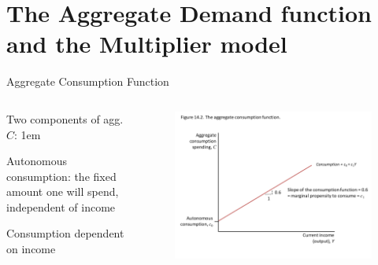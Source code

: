 \documentclass[11pt,aspectratio=43,usenames,dvipsnames]{beamer}
\let\oldenumerate=\enumerate
\let\endoldenumerate=\endenumerate
\renewenvironment{enumerate}{\oldenumerate \itemsep1em}{ \endoldenumerate}
\theoremstyle{definition}
\begin{document}
\section[AD]{The Aggregate Demand function and the Multiplier model}
\label{sec:The_Aggregate_Demand_function_and_the_Multiplier_model}

\begin{frame}{Aggregate Consumption Function}
\label{slide:Aggregate_Consumption_Function}

    \begin{columns}
        \begin{column}{0.3\textwidth}
            Two components of agg. $ C $:
            \begin{enumerate}
                \item \alert{Autonomous consumption}: the fixed amount one will spend, independent of income
                \item Consumption dependent on \alert{income}
            \end{enumerate}
        \end{column}
        \begin{column}{0.7\textwidth}
            \begin{figure}
                \centering
                \includegraphics[width=\textwidth]{./figures/2.pdf}
            \end{figure}

        \end{column}
    \end{columns}

\end{frame}
\end{document}
